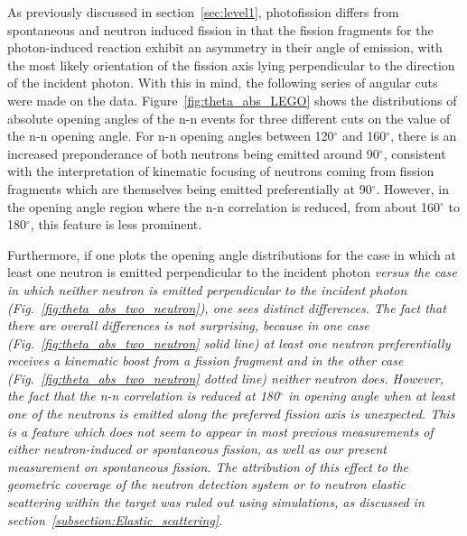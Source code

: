 As previously discussed in section~\ref{sec:level1}, photofission differs from spontaneous and neutron induced fission in that the fission fragments for the photon-induced reaction exhibit an asymmetry in their angle of emission, with the most likely orientation of the fission axis lying perpendicular to the direction of the incident photon.
With this in mind, the following series of angular cuts were made on the data.
Figure~\ref{fig:theta_abs_LEGO} shows the distributions of absolute opening angles of the n-n events for three different cuts on the value of the n-n opening angle.
For n-n opening angles between 120$^{\circ}$ and 160$^{\circ}$, there is an increased preponderance of both neutrons being emitted around 90$^{\circ}$, consistent with the interpretation of kinematic focusing of neutrons coming from fission fragments which are themselves being emitted preferentially at 90$^{\circ}$.
However, in the opening angle region where the n-n correlation is reduced, from about 160$^{\circ}$ to 180$^{\circ}$, this feature is less prominent.

Furthermore, if one plots the opening angle distributions for the case in which at least one neutron is emitted perpendicular to the incident photon \em{versus} the case in which neither neutron is emitted perpendicular to the incident photon (Fig.~\ref{fig:theta_abs_two_neutron}), one sees distinct differences.
The fact that there are overall differences is not surprising, because in one case (Fig.~\ref{fig:theta_abs_two_neutron} solid line) at least one neutron preferentially receives a kinematic boost from a fission fragment and in the other case (Fig.~\ref{fig:theta_abs_two_neutron} dotted line) neither neutron does.
However, the fact that the n-n correlation is reduced at 180$^{\circ}$ in opening angle when at least one of the neutrons is emitted along the preferred fission axis is unexpected.
This is a feature which does not seem to appear in most previous measurements of either neutron-induced or spontaneous fission, as well as our present measurement on spontaneous fission.
The attribution of this effect to the geometric coverage of the neutron detection system or to neutron elastic scattering within the target was ruled out using simulations, as discussed in section~\ref{subsection:Elastic_scattering}.

